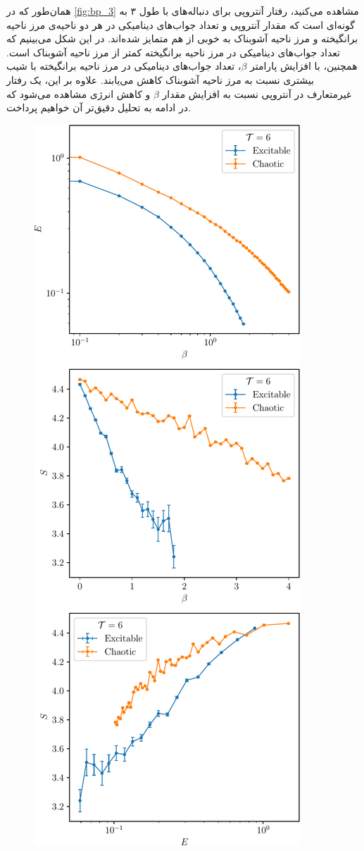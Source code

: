 همان‌طور که در
\autoref{fig:bp_3}
مشاهده می‌کنید، رفتار آنتروپی برای دنباله‌های با طول ۳ به گونه‌ای است که مقدار آنتروپی و تعداد جواب‌های دینامیکی در هر دو ناحیه‌ی مرز ناحیه برانگیخته و مرز ناحیه آشوبناک به خوبی از هم متمایز شده‌اند.
در این شکل می‌بینیم که تعداد جواب‌های دینامیکی در مرز ناحیه برانگیخته کمتر از مرز ناحیه آشوبناک است.
همچنین، با افزایش پارامتر
\( \beta \)،
تعداد جواب‌های دینامیکی در مرز ناحیه برانگیخته با شیب بیشتری نسبت به مرز ناحیه آشوبناک کاهش می‌یابند.
علاوه بر این، یک رفتار غیرمتعارف در آنتروپی نسبت به افزایش مقدار
\( \beta \)
و کاهش انرژی مشاهده می‌شود که در ادامه به تحلیل دقیق‌تر آن خواهیم پرداخت.

\begin{figure}
    \centering
    \includegraphics[height=0.9\textheight]{figures/bp_6}

\end{figure}
